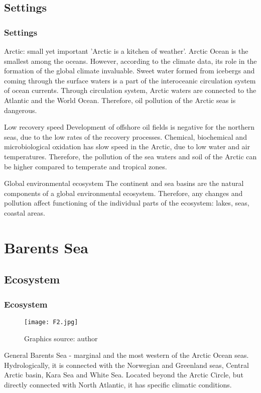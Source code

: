 \documentclass[pdflatex,compress,8pt,
	xcolor={dvipsnames,dvipsnames,svgnames,x11names,table},
	hyperref={	
	breaklinks = true, 
	pdfauthor={Lemenkova Polina}, 
	pdfsubject={Presentation}, 
	pdfcreator={Lemenkova Polina}, 
	pdfproducer={Lemenkova Polina}, 
	colorlinks=true,
	linkcolor=NavyBlue, 
	citecolor=NavyBlue, 
	urlcolor = NavyBlue, 
	breaklinks = true}]{beamer}
\begin{document}
\subsection{Settings}
\begin{frame}\frametitle{Settings}

	\begin{alertblock}{Arctic: small yet important}
'Arctic is a kitchen of weather'. Arctic Ocean is the smallest among the oceans. However, according to the climate data, its role in the formation of the global climate invaluable. Sweet water formed from icebergs and coming through the surface waters is a part of the interoceanic circulation system of ocean currents. Through circulation system, Arctic waters are connected to the Atlantic and the World Ocean. Therefore, oil pollution of the Arctic seas is dangerous.
	\end{alertblock}

	\begin{block}{Low recovery speed}
Development of offshore oil fields is negative for the northern seas, due to the low rates of the recovery processes. Chemical, biochemical and microbiological oxidation has slow speed in the Arctic, due to low water and air temperatures. Therefore, the pollution of the sea waters and soil of the Arctic can be higher compared to temperate and tropical zones.
	\end{block}

	\begin{alertblock}{Global environmental ecosystem}
The continent and sea basins are the natural components of a global environmental ecosystem. Therefore, any changes and pollution affect functioning of the individual parts of the ecosystem: lakes, seas, coastal areas.
	\end{alertblock}

\end{frame}

\section{Barents Sea}
\subsection{Ecosystem}
\begin{frame}\frametitle{Ecosystem}
\begin{figure}[H]
	\centering
		\texttt{[image: F2.jpg]}\caption{Graphics source: author}
\end{figure}

\begin{alertblock}{General}
\small{
Barents Sea - marginal and the most western of the Arctic Ocean seas. Hydrologically, it is connected with the Norwegian and Greenland seas, Central Arctic basin, Kara Sea and White Sea. Located beyond the Arctic Circle, but directly connected with North Atlantic, it has specific climatic conditions. 
}
\end{alertblock}

\end{frame}
\end{document}
